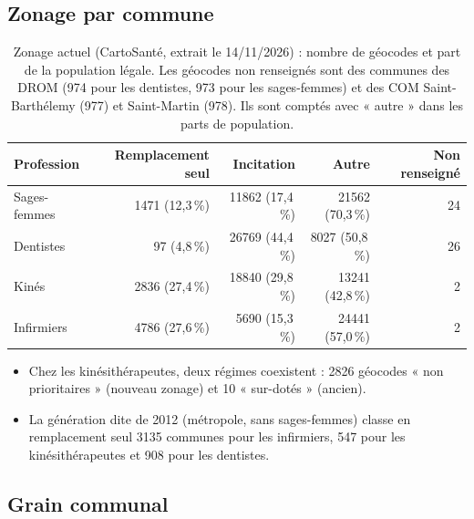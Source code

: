 \documentclass[11pt]{article}
\begin{document}
\subsection{Zonage par commune}\label{sec:res-zonage}
\begin{table}[h]
\centering\small
\begin{tabular}{@{}lrrrr@{}}
\toprule
Profession & Remplacement seul & Incitation & Autre & Non renseigné \\
\midrule
Sages-femmes & \num{1471} \;(12,3\,\%) & \num{11862} \;(17,4\,\%) & \num{21562} \;(70,3\,\%) & 24 \\
Dentistes & 97 \;(4,8\,\%) & \num{26769} \;(44,4\,\%) & \num{8027} \;(50,8\,\%) & 26 \\
Kinés & \num{2836} \;(27,4\,\%) & \num{18840} \;(29,8\,\%) & \num{13241} \;(42,8\,\%) & 2 \\
Infirmiers & \num{4786} \;(27,6\,\%) & \num{5690} \;(15,3\,\%) & \num{24441} \;(57,0\,\%) & 2 \\
\bottomrule
\end{tabular}
\caption{Zonage actuel (CartoSanté, extrait le 14/11/2026) : nombre de géocodes et part de la population
légale\mesure{}. Les géocodes non renseignés sont des communes des DROM (974 pour les dentistes, 973 pour les
sages-femmes) et des COM Saint-Barthélemy (977) et Saint-Martin (978). Ils sont comptés avec « autre » dans les
parts de population.}
\label{tab:zonage}
\end{table}

\begin{itemize}
  \item Chez les kinésithérapeutes, deux régimes coexistent : \num{2826} géocodes « non prioritaires » (nouveau
  zonage) et 10 « sur-dotés » (ancien)\mesure{}.
  \item La génération dite de 2012 (métropole, sans sages-femmes) classe en remplacement seul \num{3135} communes pour
  les infirmiers, 547 pour les kinésithérapeutes et 908 pour les dentistes\mesure{}.
\end{itemize}

\subsection{Grain communal}\label{sec:res-grain}
\end{document}
